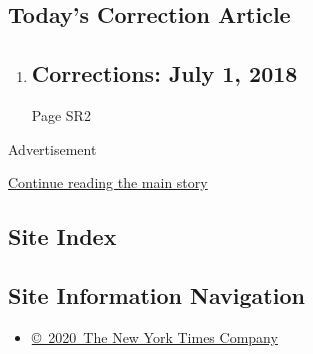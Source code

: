 \hypertarget{todays-correction-article}{%
\subsection{Today's Correction
Article}\label{todays-correction-article}}

\begin{enumerate}
\def\labelenumi{\arabic{enumi}.}
\item
  \href{/2018/06/30/pageoneplus/corrections-july-1-2018.html}{}

  \hypertarget{corrections-july-1-2018}{%
  \subsection{Corrections: July 1, 2018}\label{corrections-july-1-2018}}

  Page SR2
\end{enumerate}

Advertisement

\protect\hyperlink{after-mid9}{Continue reading the main story}

\hypertarget{site-index}{%
\subsection{Site Index}\label{site-index}}

\hypertarget{site-information-navigation}{%
\subsection{Site Information
Navigation}\label{site-information-navigation}}

\begin{itemize}
\tightlist
\item
  \href{https://help.nytimes3xbfgragh.onion/hc/en-us/articles/115014792127-Copyright-notice}{©~2020~The
  New York Times Company}
\end{itemize}

